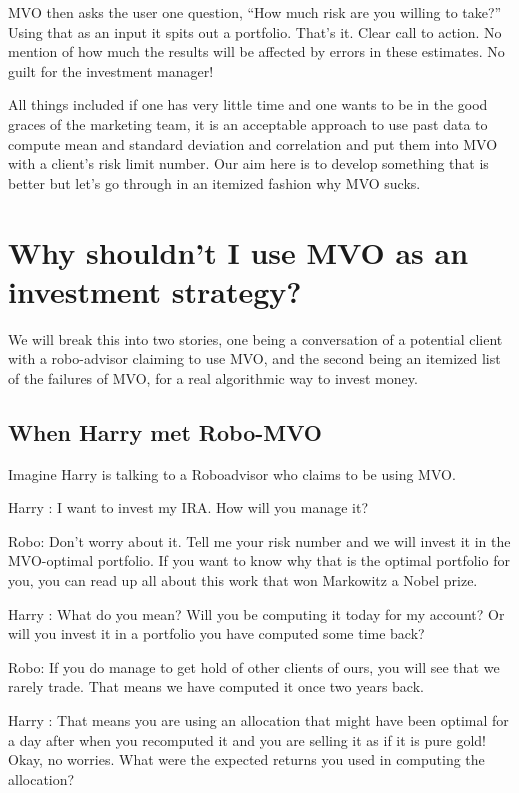 \documentclass[a4paper]{article}
\begin{document}
MVO then asks the user one question, “How much risk are you willing to take?” Using that as an input it spits out a portfolio. That’s it. Clear call to action. No mention of how much the results will be affected by errors in these estimates. No guilt for the investment manager!

All things included if one has very little time and one wants to be in the good graces of the marketing team, it is an acceptable approach to use past data to compute mean and standard deviation and correlation and put them into MVO with a client’s risk limit number. Our aim here is to develop something that is better but let’s go through in an itemized fashion why MVO sucks.


\section{ Why shouldn’t I use MVO as an investment strategy? \label{drawbacks}}
We will break this into two stories, one being a conversation of a potential client with a robo-advisor claiming to use MVO, and the second being an itemized list of the failures of MVO, for a real algorithmic way to invest money.
\subsection{ When Harry met Robo-MVO \label{conversational-drawbacks}}
Imagine Harry is talking to a Roboadvisor who claims to be using MVO.


Harry : I want to invest my IRA. How will you manage it?


Robo: Don’t worry about it. Tell me your risk number and we will invest it in the MVO-optimal portfolio. If you want to know why that is the optimal portfolio for you, you can read up all about this work that won Markowitz a Nobel prize.


Harry : What do you mean? Will you be computing it today for my account? Or will you invest it in a portfolio you have computed some time back?


Robo: If you do manage to get hold of other clients of ours, you will see that we rarely trade. That means we have computed it once two years back.


Harry : That means you are using an allocation that might have been optimal for a day after when you recomputed it and you are selling it as if it is pure gold! Okay, no worries. What were the expected returns you used in computing the allocation?
\end{document}
